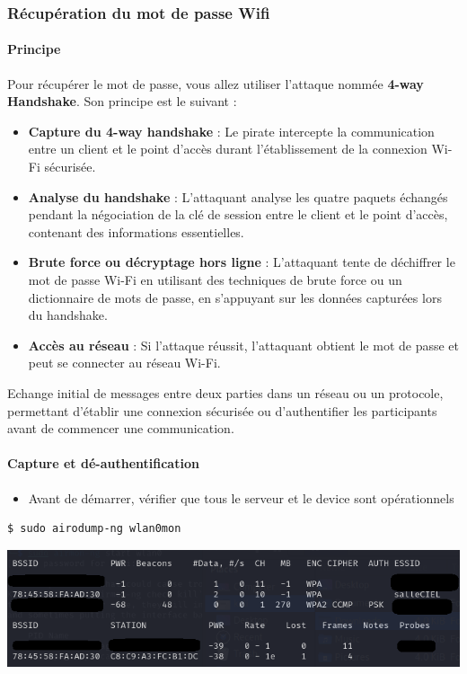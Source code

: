 \documentclass[french, 12pt]{article}%
\newcommand{\itemE}{\item[$\bullet$]}
\newcommand{\titreencadre}{Titre}
\newenvironment{encadre}[1]{\renewcommand{\titreencadre}{#1}
	\begin{mdframed}[style=encadrestyle]
	\vspace{0.5\baselineskip}
	}{%
	\end{mdframed}}
\begin{document}
\subsubsection{Récupération du mot de passe Wifi}

\paragraph{Principe}
Pour récupérer le mot de passe, vous allez utiliser l'attaque nommée \textbf{4-way Handshake}. Son principe est le suivant :
\begin{itemize}
\itemE \textbf{Capture du 4-way handshake} : Le pirate intercepte la communication entre un client et le point d'accès durant l'établissement de la connexion Wi-Fi sécurisée.
\itemE \textbf{Analyse du handshake} : L'attaquant analyse les quatre paquets échangés pendant la négociation de la clé de session entre le client et le point d'accès, contenant des informations essentielles.
\itemE \textbf{Brute force ou décryptage hors ligne} : L'attaquant tente de déchiffrer le mot de passe Wi-Fi en utilisant des techniques de brute force ou un dictionnaire de mots de passe, en s'appuyant sur les données capturées lors du handshake.
\itemE \textbf{Accès au réseau} : Si l'attaque réussit, l'attaquant obtient le mot de passe et peut se connecter au réseau Wi-Fi.
\end{itemize}

\begin{encadre}{Handshake}
Echange initial de messages entre deux parties dans un réseau ou un protocole, permettant d'établir une connexion sécurisée ou d'authentifier les participants avant de commencer une communication.
\end{encadre}


\paragraph{Capture et dé-authentification}

\begin{itemize}
\itemE Avant de démarrer, vérifier que tous le serveur et le device sont opérationnels
\end{itemize}

\begin{lstlisting}[style=commande]
$ sudo airodump-ng wlan0mon
\end{lstlisting}


\begin{center}
\includegraphics[scale=0.7]{./ressource/visuaReseau.png}
\end{center}
\end{document}
